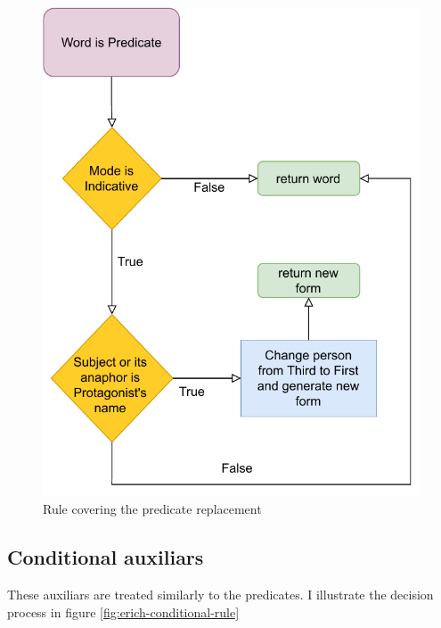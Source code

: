 \begin{figure}[!htbp]
\includegraphics[]{data/Erich-Predicate-Rule.pdf}
\caption{Rule covering the predicate replacement}
\label{fig:erich-predicate-rule}
\end{figure}

\subsection{Conditional auxiliars}

These auxiliars are treated similarly to the predicates. I illustrate the decision process in figure \ref{fig:erich-conditional-rule}


